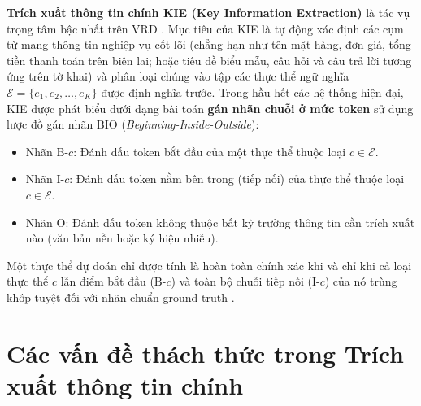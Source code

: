 \textbf{Trích xuất thông tin chính KIE (Key Information Extraction)} là tác vụ trọng tâm bậc nhất trên VRD \cite{jaume2019funsd, park2019cord, huang2022layoutlmv3}. Mục tiêu của KIE là tự động xác định các cụm từ mang thông tin nghiệp vụ cốt lõi (chẳng hạn như tên mặt hàng, đơn giá, tổng tiền thanh toán trên biên lai; hoặc tiêu đề biểu mẫu, câu hỏi và câu trả lời tương ứng trên tờ khai) và phân loại chúng vào tập các thực thể ngữ nghĩa $\mathcal{E} = \{e_1, e_2, \dots, e_K\}$ được định nghĩa trước. Trong hầu hết các hệ thống hiện đại, KIE được phát biểu dưới dạng bài toán \textbf{gán nhãn chuỗi ở mức token} sử dụng lược đồ gán nhãn $\text{BIO}$ (\textit{Beginning-Inside-Outside}):
\begin{itemize}
    \item Nhãn $\text{B-}c$: Đánh dấu token bắt đầu của một thực thể thuộc loại $c \in \mathcal{E}$.
    \item Nhãn $\text{I-}c$: Đánh dấu token nằm bên trong (tiếp nối) của thực thể thuộc loại $c \in \mathcal{E}$.
    \item Nhãn $\text{O}$: Đánh dấu token không thuộc bất kỳ trường thông tin cần trích xuất nào (văn bản nền hoặc ký hiệu nhiễu).
\end{itemize}
Một thực thể dự đoán chỉ được tính là hoàn toàn chính xác khi và chỉ khi cả loại thực thể $c$ lẫn điểm bắt đầu ($\text{B-}c$) và toàn bộ chuỗi tiếp nối ($\text{I-}c$) của nó trùng khớp tuyệt đối với nhãn chuẩn ground-truth \cite{jaume2019funsd}.

\section{Các vấn đề thách thức trong Trích xuất thông tin chính}

